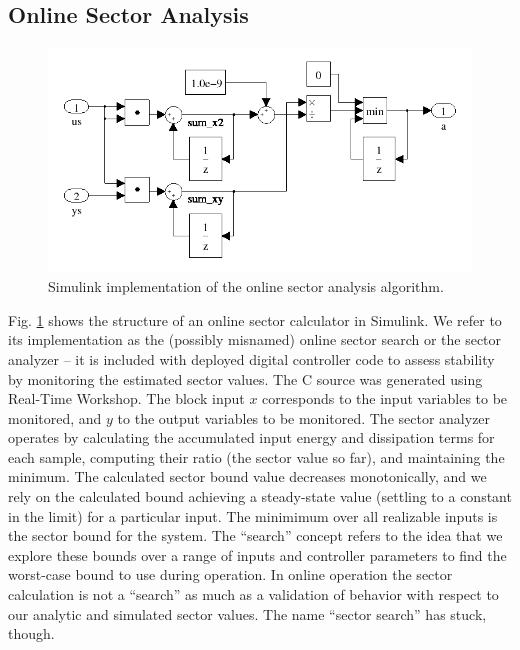 \subsection{Online Sector Analysis}


\begin{figure}[tb]
\centering
\includegraphics[width=\columnwidth]{figures/srch_block}
    \caption{Simulink implementation of the online sector analysis algorithm.}
    \label{fig:sectorsearch}
\end{figure}

Fig. \ref{fig:sectorsearch} shows the structure of an online sector calculator in Simulink.  We 
refer to its implementation as the (possibly misnamed) online sector search or the sector 
analyzer -- it is included with deployed digital controller code to assess stability by monitoring 
the estimated sector values. The C source was generated using Real-Time Workshop.  The block 
input $x$ corresponds to the input variables to be monitored, and $y$ to the output
variables to be monitored.  The sector analyzer operates by calculating the accumulated 
input energy and dissipation terms for each sample, computing their ratio (the sector 
value so far), and maintaining the minimum.  The calculated sector bound value decreases 
monotonically, and we rely on the calculated bound achieving a steady-state value (settling to 
a constant in the limit) for a particular input.  The minimimum over all realizable inputs is 
the sector bound for the system. The ``search'' concept refers to the 
idea that we explore these bounds over a range of inputs and controller parameters 
to find the worst-case bound to use during operation.  In online 
operation the sector calculation is not a ``search'' as much as a validation of behavior 
with respect to our analytic and simulated sector values.  The name ``sector search'' has
stuck, though.

